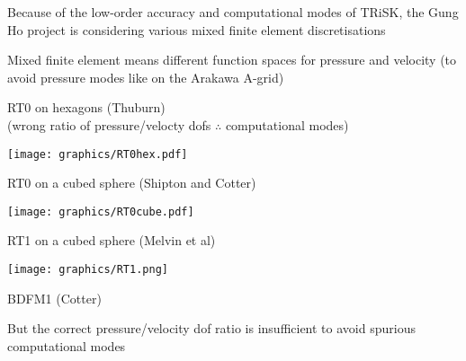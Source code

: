\begin{slide}

Because of the low-order accuracy and computational modes of TRiSK, the Gung Ho project is considering various mixed finite element discretisations

\begin{list0}
    \item Mixed finite element means different function spaces for pressure and velocity (to avoid pressure modes like on the Arakawa A-grid)
    \begin{list1}
    \item \vspace{-1.5cm}
           \begin{minipage}[t]{0.65\linewidth}\raggedright
           RT0 on hexagons (Thuburn) \\
           (wrong ratio of pressure/velocty dofs $\therefore$ computational modes)
           \end{minipage}\hfill
           \begin{minipage}[c]{0.3\linewidth}
               \vspace{1.5cm}\texttt{[image: graphics/RT0hex.pdf]}
           \end{minipage}
    \item \vspace{-2cm}
          \begin{minipage}[t]{0.65\linewidth}\raggedright
        RT0 on a cubed sphere (Shipton and Cotter)
          \end{minipage}\hfill
          \begin{minipage}[c]{0.3\linewidth}
              \vspace{1.5cm}\texttt{[image: graphics/RT0cube.pdf]}
          \end{minipage}
    \item \vspace{-1.5cm}
          \begin{minipage}[t]{0.65\linewidth}\raggedright
              RT1 on a cubed sphere (Melvin et al)
          \end{minipage}\hfill
          \begin{minipage}[c]{0.3\linewidth}
      \vspace{1.5cm}\texttt{[image: graphics/RT1.png]}
          \end{minipage}
    \item \vspace{-1.5cm} BDFM1 (Cotter)
    \end{list1}
    \item But the correct pressure/velocity dof ratio is insufficient to avoid spurious computational modes
\end{list0}

\end{slide}

